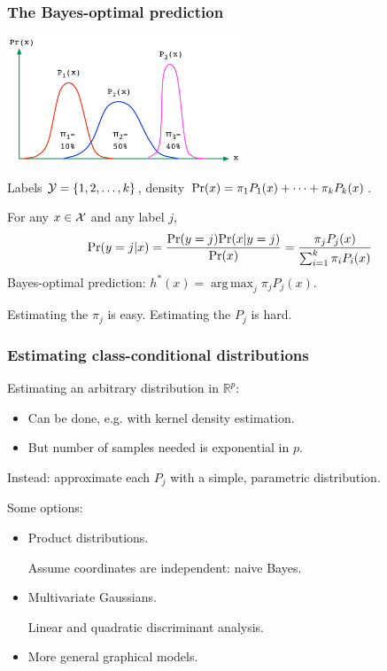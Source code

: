 \documentclass[smaller]{beamer}
\def\X{{\cal X}}
\def\Y{{\cal Y}}
\def\R{{\mathbb R}}
\def\darkred{\color{red!70!black}}
\def\darkgreen{\color{green!60!black}}
\DeclareMathOperator*{\argmax}{arg\,max}
\def\vone{{\vskip.1in}}
\def\v2{{\vskip.2in}}
\def\R{{\mathbb R}}
\def\pr{{\mbox{\rm Pr}}}
\begin{document}
\begin{frame}
\frametitle{The Bayes-optimal prediction}

\begin{center}
\includegraphics[width=2.75in]{mixture.pdf}
\end{center}

{\darkred Labels $\Y = \{1,2,\ldots,k\}$, density
$\pr(x) = \pi_1 P_1(x) + \cdots + \pi_k P_k(x)$.}

\pause\vone
For any $x \in \X$ and any label $j$,
$$ \pr(y = j | x)
= \frac{\pr(y=j) \pr(x|y=j)}{\pr(x)}
= \frac{\pi_j P_j(x)}{\sum_{i=1}^k \pi_i P_i(x)}
$$
\pause Bayes-optimal prediction:
$h^*(x) = \argmax_j \pi_j P_j(x)$.

\pause\vone
\alert{Estimating the $\pi_j$ is easy. Estimating the $P_j$ is hard.}

\end{frame}

\begin{frame}
\frametitle{Estimating class-conditional distributions}

{\darkred Estimating an arbitrary distribution in $\R^p$:}
\begin{itemize}
\item {\darkred Can be done, e.g. with kernel density estimation.}
\item {\darkred But number of samples needed is exponential in $p$.}
\end{itemize}

\pause\v2
\alert{Instead: approximate each $P_j$ with a simple, parametric distribution.} 

\pause\v2
Some options:
\begin{itemize}
\item Product distributions.

{\darkgreen Assume coordinates are independent: naive Bayes.}

\item Multivariate Gaussians.

{\darkgreen Linear and quadratic discriminant analysis.}

\item More general graphical models.

\end{itemize}
\end{frame}
\end{document}
